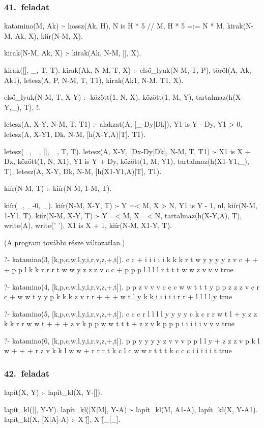 \subsubsection*{41.~feladat}
\begin{program}
katamino(M, Ak) :-
    hossz(Ak, H), N is H * 5 // M,
    H * 5 =:= N * M,
    kirak(N-M, Ak, X), kiír(N-M, X).

kirak(N-M, Ak, X) :- kirak(Ak, N-M, [], X).

kirak([], _, T, T).
kirak(Ak, N-M, T, X) :-
    első_lyuk(N-M, T, P),
    töröl(A, Ak, Ak1),
    letesz(A, P, N-M, T, T1),
    kirak(Ak1, N-M, T1, X).

első_lyuk(N-M, T, X-Y) :-
    között(1, N, X), között(1, M, Y),
    \+ tartalmaz(h(X-Y,_), T), !.

letesz(A, X-Y, N-M, T, T1) :-
    alakzat(A, [_-Dy|Dk]),
    Y1 is Y - Dy, Y1 > 0,
    letesz(A, X-Y1, Dk, N-M, [h(X-Y,A)|T], T1).

letesz(_, _, [], _, T, T).
letesz(A, X-Y, [Dx-Dy|Dk], N-M, T, T1) :-
    X1 is X + Dx, között(1, N, X1),
    Y1 is Y + Dy, között(1, M, Y1),
    \+ tartalmaz(h(X1-Y1,_), T),
    letesz(A, X-Y, Dk, N-M, [h(X1-Y1,A)|T], T1).

kiír(N-M, T) :- kiír(N-M, 1-M, T).

kiír(_, _-0, _).
kiír(N-M, X-Y, T) :-
    Y =< M, X > N, Y1 is Y - 1, nl,
    kiír(N-M, 1-Y1, T).
kiír(N-M, X-Y, T) :-
    Y =< M, X =< N,
    tartalmaz(h(X-Y,A), T),
    write(A), write(' '),
    X1 is X + 1,
    kiír(N-M, X1-Y, T).
\end{program}
(A program további része változatlan.)
\begin{query}
?- katamino(3, [k,p,c,w,l,y,i,r,v,z,+,t]).
c c + i i i i i k k k r t w y y y y z v 
c + + + p p l k k r r r t w w y z z z v 
c c + p p p l l l l r t t t w w z v v v 
true 

?- katamino(4, [k,p,c,w,l,y,i,r,v,z,+,t]).
p p z v v v c c c w w t t t y 
p p z z z v c r c + w w t y y 
p k k k z v r r + + + w t l y 
k k i i i i i r r + l l l l y 
true 

?- katamino(5, [k,p,c,w,l,y,i,r,v,z,+,t]).
c c c r l l l l y y y y 
c k c r r w t l + y z z 
k k r r w w t + + + z v 
k p p w w t t t + z z v 
k p p p i i i i i v v v 
true 

?- katamino(6, [k,p,c,w,l,y,i,r,v,z,+,t]).
p p y y y y z v v v 
p p l l y + z z z v 
p k l w + + + r z v 
k k l w w + r r r t 
k c l c w w r t t t 
k c c c i i i i i t 
true 
\end{query}
\subsubsection*{42.~feladat}
\begin{program}
lapít(X, Y) :- lapít_kl(X, Y-[]).

lapít_kl([], Y-Y).
lapít_kl([X|M], Y-A) :-
    lapít_kl(M, A1-A), lapít_kl(X, Y-A1).
lapít_kl(X, [X|A]-A) :- X \= [], X \= [_|_].
\end{program}
